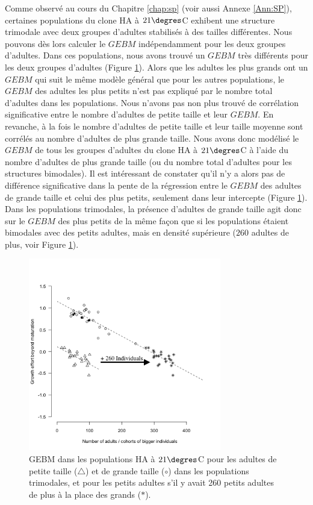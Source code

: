 Comme observé au cours du Chapitre \ref{chap:sp} (voir aussi Annexe
\ref{Ann:SP}), certaines populations du clone HA à $21\degres$C exhibent une structure trimodale avec deux groupes d'adultes
stabilisés à des tailles différentes. Nous pouvons dès lors calculer le $GEBM$
indépendamment pour les deux groupes d'adultes.
Dans ces populations, nous avons trouvé un $GEBM$ très différents pour les deux
groupes d'adultes (Figure \ref{fig:FIP6}). Alors que les adultes les plus grands
ont un $GEBM$ qui suit le même modèle général que pour les autres populations,
le $GEBM$ des adultes les plus petits n'est pas expliqué par le nombre total
d'adultes dans les populations. Nous n'avons pas non plus trouvé de corrélation
significative entre le nombre d'adultes de petite taille et leur $GEBM$. En
revanche, à la fois le nombre d'adultes de petite taille et leur taille moyenne
sont corrélés au nombre d'adultes de plus grande taille. Nous avons donc
modélisé le $GEBM$ de tous les groupes d'adultes du clone HA à $21\degres$C à
l'aide du nombre d'adultes de plus grande taille (ou du nombre total d'adultes
pour les structures bimodales). Il est intéressant de constater qu'il n'y a
alors pas de différence significative dans la pente de la régression entre le
$GEBM$ des adultes de grande taille et celui des plus petits, seulement dans
leur intercepte (Figure \ref{fig:FIP6}). Dans les populations trimodales, la
présence d'adultes de grande taille agit donc sur le $GEBM$ des plus petits de
la même façon que si les populations étaient bimodales avec des petits adultes,
mais en densité supérieure ($260$ adultes de plus, voir Figure \ref{fig:FIP6}).

\begin{figure}[!ht]
\begin{center}
\includegraphics[width=0.75\textwidth]{1_CorpsDeThese/Resumes/Fig/FIP06}
\caption[GEBM dans les
populations HA à $21\degres$C]{GEBM dans les
populations HA à $21\degres$C pour les adultes de petite taille ($\triangle$) et
de grande taille ($\circ$) dans les populations trimodales, et pour les petits
adultes s'il y avait 260 petits adultes de plus à la place des grands ($\ast$).}
\label{fig:FIP6}
\end{center}
\end{figure}

